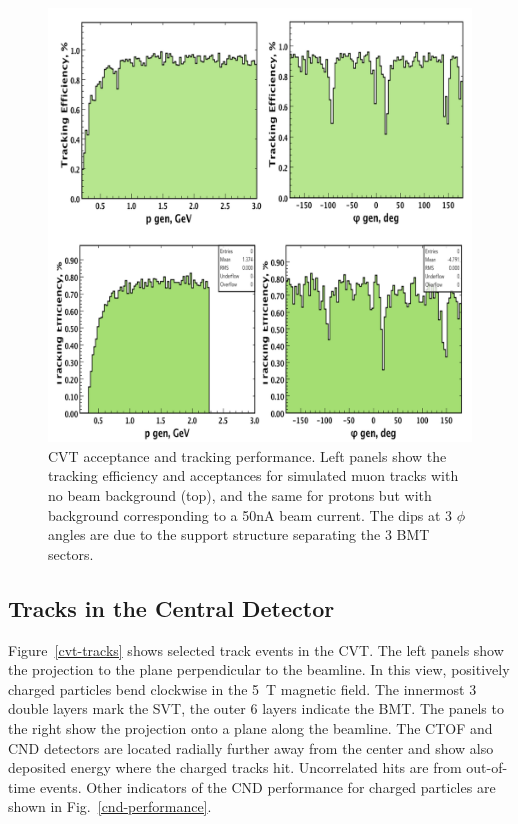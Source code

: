 \documentclass[final,3p,twocolumn]{elsarticle}
\begin{document}
\begin{figure}[thbp!]
\centerline{\includegraphics[width=1.0\columnwidth]{cvt-acceptance.png}}
\caption{CVT acceptance and tracking performance. Left panels show the tracking efficiency and acceptances for 
simulated muon tracks with no beam background (top), and the same for protons but with background corresponding to 
a 50nA beam current. The dips at 3 $\phi$ angles are due to the support structure separating the 3 BMT sectors.}
\label{cvt-acceptance}
\end{figure}


\subsection{Tracks in the Central Detector}

Figure~\ref{cvt-tracks} shows selected track events in the CVT. The left panels show the projection to the plane perpendicular to the beamline. In this view, positively charged particles bend clockwise in the 5~T magnetic field. The innermost 3 double layers mark the SVT, the outer 6 layers indicate the BMT. The panels to the right show the projection onto a plane along the beamline. The CTOF and CND detectors are located radially further away from the center and show also deposited energy where the charged tracks hit. Uncorrelated hits are from out-of-time events. Other indicators of the CND performance for charged particles are shown in Fig.~\ref{cnd-performance}.  
\end{document}
